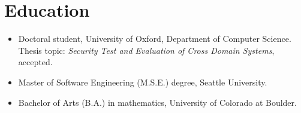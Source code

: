 \section*{Education}
\vspace{-2mm}

\begin{itemize}
	\item Doctoral student, University of Oxford, Department of
		Computer Science. Thesis topic: \emph{Security Test and
		Evaluation of Cross Domain Systems}, accepted.\vspace{-1mm}
	\item Master of Software Engineering (M.S.E.) degree, Seattle University.\vspace{-1mm}
	\item Bachelor of Arts (B.A.) in mathematics, University of Colorado at Boulder.
\end{itemize}

